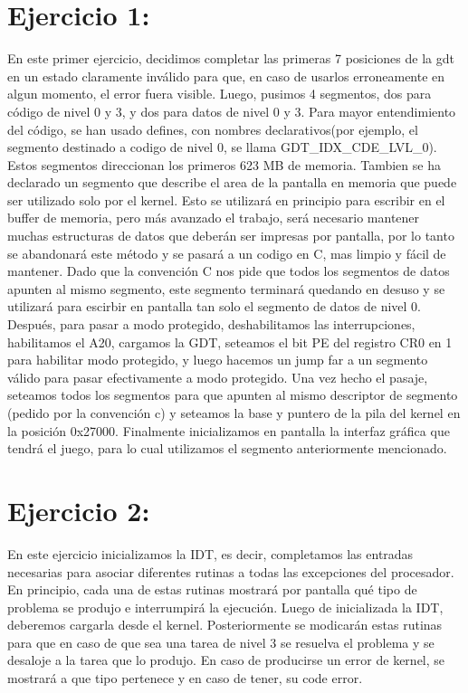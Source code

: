 \documentclass[a4paper]{article}
\begin{document}
\section{Ejercicio 1:}
En este primer ejercicio, decidimos completar las primeras 7 posiciones de la gdt en un estado claramente inválido para que, en caso de usarlos erroneamente en algun momento, el error fuera visible. Luego, pusimos 4 segmentos, dos para código de nivel 0 y 3, y dos para datos de nivel 0 y 3. Para mayor entendimiento del código, se han usado defines, con nombres declarativos(por ejemplo, el segmento destinado a codigo de nivel 0, se llama GDT_IDX_CDE_LVL_0). Estos segmentos direccionan los primeros 623 MB de memoria. Tambien se ha declarado un segmento que describe el area de la pantalla en memoria que puede ser utilizado solo por el kernel. Esto se utilizará en principio para escribir en el buffer de memoria, pero más avanzado el trabajo, será necesario mantener muchas estructuras de datos que deberán ser impresas por pantalla, por lo tanto se abandonará este método y se pasará a un codigo en C, mas limpio y fácil de mantener. Dado que la convención C nos pide que todos los segmentos de datos apunten al mismo segmento, este segmento terminará quedando en desuso y se utilizará para escirbir en pantalla tan solo el segmento de datos de nivel 0. Después, para pasar a modo protegido, deshabilitamos las interrupciones, habilitamos el A20, cargamos la GDT, seteamos el bit PE del registro CR0 en 1 para habilitar modo protegido, y luego hacemos un jump far a un segmento válido para pasar efectivamente a modo protegido. Una vez hecho el pasaje, seteamos todos los segmentos para que apunten al mismo descriptor de segmento (pedido por la convención c) y seteamos la base y puntero de la pila del kernel en la posición 0x27000. Finalmente inicializamos en pantalla la interfaz gráfica que tendrá el juego, para lo cual utilizamos el segmento anteriormente mencionado.

%

\section{Ejercicio 2:} 
%

En este ejercicio inicializamos la IDT, es decir, completamos las entradas necesarias para asociar diferentes rutinas a todas las excepciones del procesador. En principio, cada una de estas rutinas mostrará por pantalla qué tipo de problema se produjo e interrumpirá la ejecución. Luego de inicializada la IDT, deberemos cargarla desde el kernel. Posteriormente se modicarán estas rutinas para que en caso de que sea una tarea de nivel 3 se resuelva el problema y se desaloje a la tarea que lo produjo.
En caso de producirse un error de kernel, se mostrará a que tipo pertenece y en caso de tener, su code error.
\end{document}
